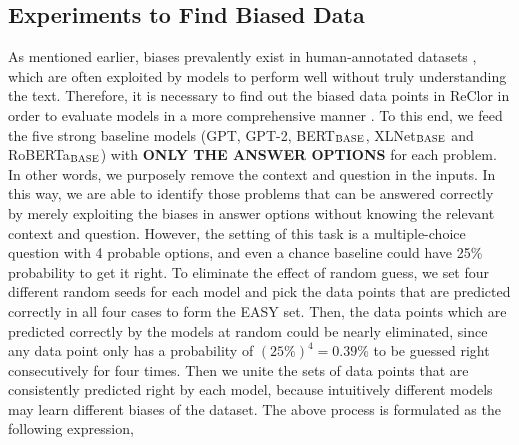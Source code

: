 \documentclass{article} \usepackage{iclr2020_conference,times}
\newcommand\bertbase{BERT$_{\small \textsc{BASE}}$\xspace}
\newcommand\xlnetbase{XLNet$_{\small \textsc{BASE}}$\xspace}
\newcommand\robertabase{RoBERTa$_{\small \textsc{BASE}}$\xspace}
\begin{document}
\subsection{Experiments to Find Biased Data}
As mentioned earlier, biases prevalently exist in human-annotated datasets \citep{poliak2018hypothesis, gururangan2018annotation, zellers2019hellaswag, niven2019probing}, which are often exploited by models to perform well without truly understanding the text. 
Therefore, it is necessary to find out the biased data points in ReClor in order to evaluate models in a more comprehensive manner \citep{sugawara2018makes}. To this end, we feed the five strong baseline models (GPT, GPT-2, \bertbase, \xlnetbase and \robertabase) with \textbf{ONLY THE ANSWER OPTIONS} for each problem. In other words, we purposely remove the context and question in the inputs. In this way, we are able to identify those problems that can be answered correctly by merely exploiting the biases in answer options without knowing the relevant context and question.  However, the setting of this task is a multiple-choice question with 4 probable options, and even a chance baseline could have 25\% probability to get it right. To eliminate the effect of random guess, we set four different random seeds for each model and pick the data points that are predicted correctly in all four cases to form the EASY set. Then, the data points which are predicted correctly by the models at random could be nearly eliminated, since any data point only has a probability of $(25\%)^{4}=0.39\%$ to be guessed right consecutively for four times. Then we unite the sets of data points that are consistently predicted right by each model, because intuitively different models may learn different biases of the dataset. The above process is formulated as the following expression,
\end{document}
